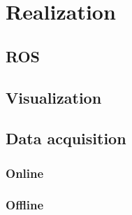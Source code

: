 \chapter{Realization}
\section{ROS}
\section{Visualization}
\section{Data acquisition}
\subsection{Online}
\subsection{Offline}
